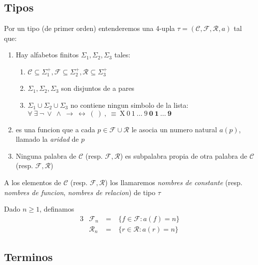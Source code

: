 \subsection{Tipos}
\begin{definition}
  Por un tipo (de primer orden) entenderemos una 4-upla $\tau = (\mathcal{C}, \mathcal{F}, \mathcal{R}, a)$ tal que:
  \begin{enumerate}
    \item Hay alfabetos finitos $\Sigma_1, \Sigma_2, \Sigma_3$ tales: \begin{enumerate}
      \item $\mathcal{C} \subseteq \Sigma_1^+, \mathcal{F} \subseteq \Sigma_2^+, \mathcal{R} \subseteq \Sigma_3^+$
      \item $\Sigma_1, \Sigma_2, \Sigma_3$ son disjuntos de a pares
      \item $\Sigma_1 \cup \Sigma_2 \cup \Sigma_3$ no contiene ningun simbolo de la lista: $\forall\ \exists\ \neg\ \lor\ \land\ \rightarrow\ \leftrightarrow\ (\ )\ ,\ \equiv\ \text{X}\ \mathit{0}\ \mathit{1}\ \dots\ \mathit{9}\ \mathbf{0}\ \mathbf{1}\ \dots\ \mathbf{9}$ 
    \end{enumerate}
    \item {} es una funcion que a cada $p \in \mathcal{F} \cup \mathcal{R}$ le asocia 
    un numero natural $a(p)$, llamado la \emph{aridad} de $p$
    \item Ninguna palabra de $\mathcal{C}$ (resp. $\mathcal{F}, \mathcal{R}$) es subpalabra propia de otra palabra de $\mathcal{C}$ (resp. $\mathcal{F}, \mathcal{R}$)
  \end{enumerate}

  A los elementos de $\mathcal{C}$ (resp. $\mathcal{F}, \mathcal{R}$) los llamaremos \emph{nombres de constante} (resp. \emph{nombres de funcion}, \emph{nombres de relacion}) de tipo $\tau$

  Dado $n \geq 1$, definamos
  \begin{alignat*}{3}
    &\mathcal{F}_n &\ =&\ \{f \in \mathcal{F} : a(f) = n\}\\
    &\mathcal{R}_n &\ =&\ \{r \in \mathcal{R} : a(r) = n\}
  \end{alignat*}
\end{definition}

\subsection{Terminos}

